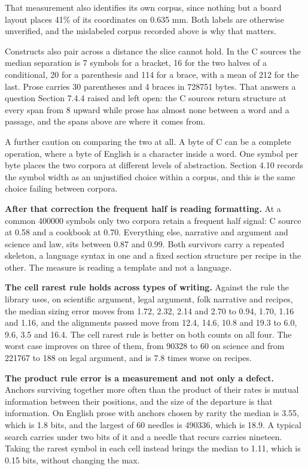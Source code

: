 That measurement also identifies its own corpus, since nothing but a board layout places 41\% of its coordinates on 0.635 mm. Both labels are otherwise unverified, and the mislabeled corpus recorded above is why that matters.

Constructs also pair across a distance the slice cannot hold. In the C sources the median separation is 7 symbols for a bracket, 16 for the two halves of a conditional, 20 for a parenthesis and 114 for a brace, with a mean of 212 for the last. Prose carries 30 parentheses and 4 braces in 728751 bytes. That answers a question Section 7.4.4 raised and left open: the C sources return structure at every span from 8 upward while prose has almost none between a word and a passage, and the spans above are where it comes from.

A further caution on comparing the two at all. A byte of C can be a complete operation, where a byte of English is a character inside a word. One symbol per byte places the two corpora at different levels of abstraction. Section 4.10 records the symbol width as an unjustified choice within a corpus, and this is the same choice failing between corpora.

\textbf{After that correction the frequent half is reading formatting.} At a common 400000 symbols only two corpora retain a frequent half signal: C source at 0.58 and a cookbook at 0.70. Everything else, narrative and argument and science and law, sits between 0.87 and 0.99. Both survivors carry a repeated skeleton, a language syntax in one and a fixed section structure per recipe in the other. The measure is reading a template and not a language.

\textbf{The cell rarest rule holds across types of writing.} Against the rule the library uses, on scientific argument, legal argument, folk narrative and recipes, the median sizing error moves from 1.72, 2.32, 2.14 and 2.70 to 0.94, 1.70, 1.16 and 1.16, and the alignments passed move from 12.4, 14.6, 10.8 and 19.3 to 6.0, 9.6, 3.5 and 16.4. The cell rarest rule is better on both counts on all four. The worst case improves on three of them, from 90328 to 60 on science and from 221767 to 188 on legal argument, and is 7.8 times worse on recipes.

\textbf{The product rule error is a measurement and not only a defect.} Anchors surviving together more often than the product of their rates is mutual information between their positions, and the size of the departure is that information. On English prose with anchors chosen by rarity the median is 3.55, which is 1.8 bits, and the largest of 60 needles is 490336, which is 18.9. A typical search carries under two bits of it and a needle that recurs carries nineteen. Taking the rarest symbol in each cell instead brings the median to 1.11, which is 0.15 bits, without changing the max.

